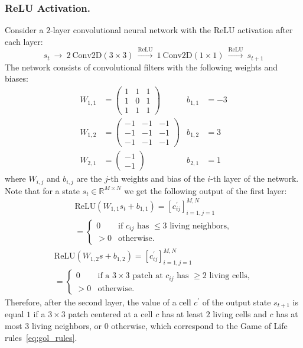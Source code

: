 \documentclass[letterpaper]{article} %
\begin{document}
\subsubsection{ReLU Activation.}
Consider a $2$-layer convolutional neural network with the ReLU activation after each layer:
\[
    s_t \ \to\ 
    2\ \text{Conv2D}(3 \times 3) \ \xrightarrow{\text{ReLU}}\ 
    1\ \text{Conv2D}(1 \times 1) \ \xrightarrow{\text{ReLU}}\ 
    s_{t+1}
\]
The network consists of convolutional filters with the following weights and biases:
\begin{align*}
    W_{1,1} &= \begin{pmatrix}
        1 & 1 & 1
        \\
        1 & 0 & 1
        \\
        1 & 1 & 1
    \end{pmatrix}
    &
    b_{1,1} &= -3
    \\
    W_{1,2} &= \begin{pmatrix}
        -1 & -1 & -1
        \\
        -1 & -1 & -1
        \\
        -1 & -1 & -1
    \end{pmatrix}
    &
    b_{1,2} &= 3
    \\
    W_{2,1} &= \begin{pmatrix} -1 \\ -1 \end{pmatrix}
    &
    b_{2,1} &= 1
\end{align*}
where $W_{i,j}$ and $b_{i,j}$ are the $j$-th weights and bias of the $i$-th layer of the network.
Note that for a state $s_t \in \mathbb{R}^{M \times N}$ we get the following output of the first layer:
\begin{multline*}
    \text{ReLU}(W_{1,1} s_t + b_{1,1})
    = [c_{ij}^\prime]_{i=1,j=1}^{M,N}
    \\
    = \left\{\begin{array}{rl}
        0 & \text{if $c_{ij}$ has $\le 3$ living neighbors,}
        \\
        > 0 & \text{otherwise.}
    \end{array}\right.
\end{multline*}
\begin{multline*}
    \text{ReLU}(W_{1,2} s + b_{1,2})
    = [c_{ij}^\prime]_{i=1,j=1}^{M,N}
    \\
    = \left\{\begin{array}{rl}
        0 & \text{if a $3 \times 3$ patch at $c_{ij}$ has $\ge 2$ living cells,}
        \\
        > 0 & \text{otherwise.}
    \end{array}\right.
\end{multline*}
Therefore, after the second layer, the value of a cell $c^\prime$ of the output state $s_{t+1}$ is equal $1$ if a $3 \times 3$ patch centered at a cell $c$ has at least $2$ living cells and $c$ has at most $3$ living neighbors, or $0$ otherwise, which correspond to the Game of Life rules~\eqref{eq:gol_rules}.
\end{document}

